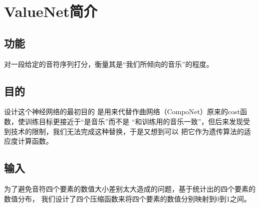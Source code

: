 \documentclass{article}
\begin{document}
  \section{ValueNet简介}  
  \subsection{功能}
    对一段给定的音符序列打分，衡量其是“我们所倾向的音乐”的程度。
  \subsection{目的}
    设计这个神经网络的最初目的
    是用来代替作曲网络（CompoNet）原来的cost函数，使训练目标更接近于“是音乐”而不是
    “和训练用的音乐一致”，但后来发现受到技术的限制，我们无法完成这种替换，于是又想到可以
    把它作为遗传算法的适应度计算函数。
  \subsection{输入}
    为了避免音符四个要素的数值大小差别太大造成的问题，基于统计出的四个要素的数值分布，
    我们设计了四个压缩函数来将四个要素的数值分别映射到0到1之间。
\end{document}
